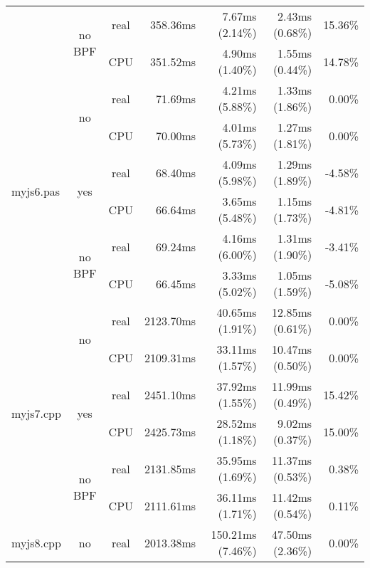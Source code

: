 \documentclass[en]{pracamgr}
\begin{document}
\begin{appendices}
\begin{small}
\begin{longtable}{|l|c|c|r|r|r|r|}
                            \cline{2-7}
                            & \multirow{2}{*}{no BPF} & real & 358.36ms & 7.67ms (2.14\%) & 2.43ms (0.68\%) & 15.36\% \\*
                            &                         & CPU  & 351.52ms & 4.90ms (1.40\%) & 1.55ms (0.44\%) & 14.78\% \\
\hline
\multirow{6}{*}{myjs6.pas}  & \multirow{2}{*}{no}     & real & 71.69ms & 4.21ms (5.88\%) & 1.33ms (1.86\%) & 0.00\% \\*
                            &                         & CPU  & 70.00ms & 4.01ms (5.73\%) & 1.27ms (1.81\%) & 0.00\% \\*
                            \cline{2-7}
                            & \multirow{2}{*}{yes}    & real & 68.40ms & 4.09ms (5.98\%) & 1.29ms (1.89\%) & -4.58\% \\*
                            &                         & CPU  & 66.64ms & 3.65ms (5.48\%) & 1.15ms (1.73\%) & -4.81\% \\*
                            \cline{2-7}
                            & \multirow{2}{*}{no BPF} & real & 69.24ms & 4.16ms (6.00\%) & 1.31ms (1.90\%) & -3.41\% \\*
                            &                         & CPU  & 66.45ms & 3.33ms (5.02\%) & 1.05ms (1.59\%) & -5.08\% \\
\hline
\multirow{6}{*}{myjs7.cpp}  & \multirow{2}{*}{no}     & real & 2123.70ms & 40.65ms (1.91\%) & 12.85ms (0.61\%) & 0.00\% \\*
                            &                         & CPU  & 2109.31ms & 33.11ms (1.57\%) & 10.47ms (0.50\%) & 0.00\% \\*
                            \cline{2-7}
                            & \multirow{2}{*}{yes}    & real & 2451.10ms & 37.92ms (1.55\%) & 11.99ms (0.49\%) & 15.42\% \\*
                            &                         & CPU  & 2425.73ms & 28.52ms (1.18\%) & 9.02ms (0.37\%) & 15.00\% \\*
                            \cline{2-7}
                            & \multirow{2}{*}{no BPF} & real & 2131.85ms & 35.95ms (1.69\%) & 11.37ms (0.53\%) & 0.38\% \\*
                            &                         & CPU  & 2111.61ms & 36.11ms (1.71\%) & 11.42ms (0.54\%) & 0.11\% \\
\hline
\multirow{6}{*}{myjs8.cpp}  & \multirow{2}{*}{no}     & real & 2013.38ms & 150.21ms (7.46\%) & 47.50ms (2.36\%) & 0.00\% \\*

\end{longtable}
\end{small}
\end{appendices}
\end{document}
